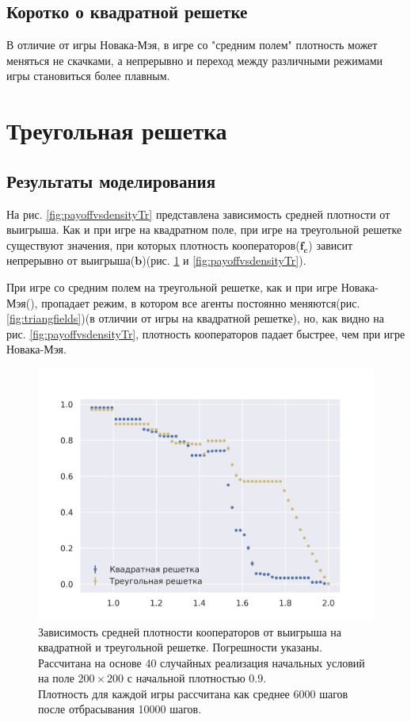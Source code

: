 \documentclass[12pt]{article}
\begin{document}
\subsection{Коротко о квадратной решетке}
    В отличие от игры Новака-Мэя, в игре со "средним полем" плотность может меняться не скачками, а непрерывно и переход между различными режимами игры становиться более плавным.
    
\section{Треугольная решетка}
\subsection{Результаты моделирования}
    На рис. \ref{fig:payoffvsdensityTr} представлена зависимость средней плотности от выигрыша. Как и при игре на квадратном поле, при игре на треугольной решетке существуют значения, при которых плотность кооператоров($\mathbf{f_c}$) зависит непрерывно от выигрыша($\mathbf{b}$)(рис. \ref{fig:payoffvsdensitytrsq} и \ref{fig:payoffvsdensityTr}).
        
    При игре со средним полем на треугольной решетке, как и при игре Новака-Мэя(\cite{KOLOTEV2018}), пропадает режим, в котором все агенты постоянно меняются(рис. \ref{fig:triangfields})(в отличии от игры на квадратной решетке), но, как видно на рис. \ref{fig:payoffvsdensityTr}, плотность кооператоров падает быстрее, чем при игре Новака-Мэя.
        
    \begin{figure}[!h]
        \centering
        \captionsetup{justification=centering}
        \includegraphics[scale=0.8]{TriangularMeanFieldGame/density_square_triangular.png}
        \caption{Зависимость средней плотности кооператоров от выигрыша на квадратной и треугольной решетке. Погрешности указаны.\\
        Рассчитана на основе 40 случайных реализация начальных условий на поле $200\times200$ с начальной плотностью $0.9$.\\
        Плотность для каждой игры рассчитана как среднее 6000 шагов после отбрасывания 10000 шагов. 
        }
        \label{fig:payoffvsdensitytrsq}
    \end{figure}
    
\end{document}
